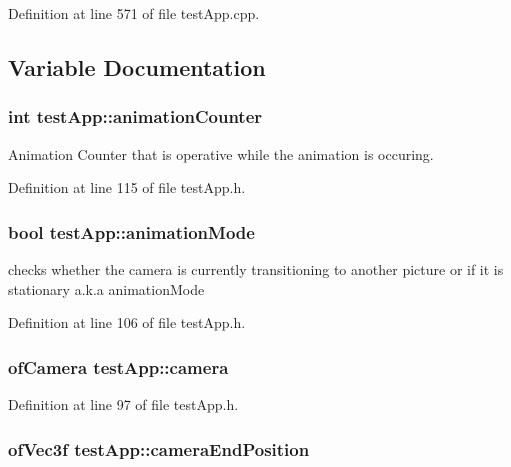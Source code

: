 Definition at line 571 of file test\-App.\-cpp.



\subsection{Variable Documentation}
\hypertarget{group___camera_ga21b16bdba744425519597fcb925df43a}{
\subsubsection[{animation\-Counter}]{\setlength{\rightskip}{0pt plus 5cm}int test\-App\-::animation\-Counter}}\label{group___camera_ga21b16bdba744425519597fcb925df43a}


Animation Counter that is operative while the animation is occuring. 



Definition at line 115 of file test\-App.\-h.

\hypertarget{group___camera_ga2a5d49fd1f7f50f745f56095a1fa0099}{
\subsubsection[{animation\-Mode}]{\setlength{\rightskip}{0pt plus 5cm}bool test\-App\-::animation\-Mode}}\label{group___camera_ga2a5d49fd1f7f50f745f56095a1fa0099}


checks whether the camera is currently transitioning to another picture or if it is stationary a.\-k.\-a animation\-Mode 



Definition at line 106 of file test\-App.\-h.

\hypertarget{group___camera_ga0278ee237cbbd881252d6273b131bb55}{
\subsubsection[{camera}]{\setlength{\rightskip}{0pt plus 5cm}of\-Camera test\-App\-::camera}}\label{group___camera_ga0278ee237cbbd881252d6273b131bb55}


Definition at line 97 of file test\-App.\-h.

\hypertarget{group___camera_gad3319d9cd3cb00e898f4f602b879efad}{
\subsubsection[{camera\-End\-Position}]{\setlength{\rightskip}{0pt plus 5cm}of\-Vec3f test\-App\-::camera\-End\-Position}}\label{group___camera_gad3319d9cd3cb00e898f4f602b879efad}


